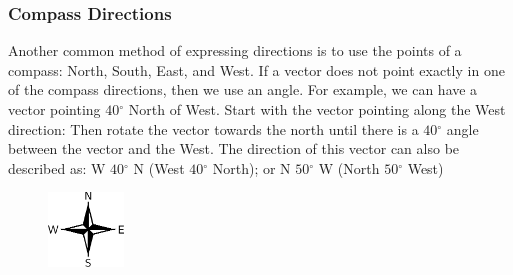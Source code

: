       \label{m38812*uid6}
            \subsubsection{ Compass Directions}
            \nopagebreak
            
        
        \label{m38812*id187246}Another common method of expressing directions is to use the points of a compass: North, South, East, and West.
If a vector does not point exactly in one of the compass directions, then we use an angle. For example, we can have a vector pointing \begin{math}40{}^{\circ }\end{math} North of West. Start with the vector pointing along the West direction:
Then rotate the vector towards the north until there is a \begin{math}40{}^{\circ }\end{math} angle between the vector and the West.
The direction of this vector can also be described as: W \begin{math}40{}^{\circ }\end{math} N (West \begin{math}40{}^{\circ }\end{math} North); or N \begin{math}50{}^{\circ }\end{math} W (North \begin{math}50{}^{\circ }\end{math} West)




    \setcounter{subfigure}{0}


	\begin{figure}[H] %
    \begin{center}
    \label{m38812*id187349!!!underscore!!!media}\label{m38812*id187349!!!underscore!!!printimage}\includegraphics[width=2cm]{col11305.imgs/m38812_PG11C1_003.png} %
        
      \vspace{2pt}
    \vspace{.1in}
    
    \end{center}

 \end{figure}   

